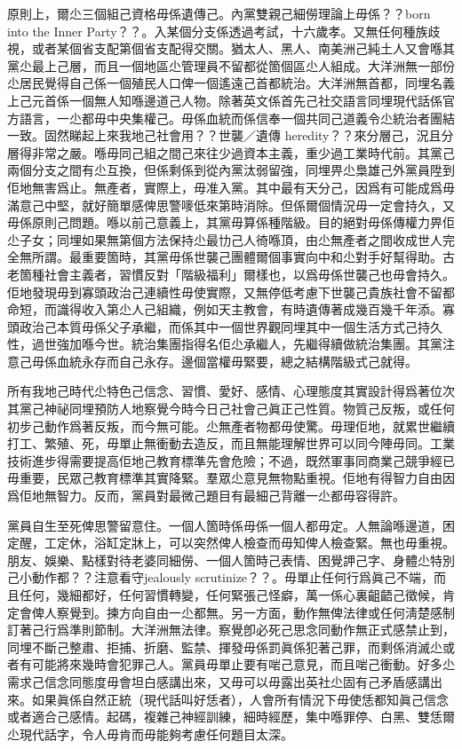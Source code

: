 原則上，爾尐三個組己資格毋係遺傳己。內黨雙親己細僗理論上毋係？？born into the Inner Party？？。入某個分支係透過考試，十六歲孝。又無任何種族歧視，或者某個省支配第個省支配得交關。猶太人、黑人、南美洲己純土人又會喺其黨尐最上己層，而且一個地區尐管理員不留都從箇個區尐人組成。大洋洲無一部份尐居民覺得自己係一個殖民人口俾一個遙遠己首都統治。大洋洲無首都，同埋名義上己元首係一個無人知喺邊道己人物。除著英文係首先己社交語言同埋現代話係官方語言，一尐都毋中央集權己。毋係血統而係信奉一個共同己道義令尐統治者團結一致。固然睇起上來我地己社會用？？世襲／遺傳 heredity？？來分層己，況且分層得非常之嚴。喺毋同己組之間己來往少過資本主義，重少過工業時代前。其黨己兩個分支之間有尐互換，但係剩係到從內黨汰弱留強，同埋畀尐梟雄己外黨員陞到佢地無害爲止。無產者，實際上，毋准入黨。其中最有天分己，因爲有可能成爲毋滿意己中堅，就好簡單感俾思警嘜低來第時消除。但係爾個情況毋一定會持久，又毋係原則己問題。喺以前己意義上，其黨毋算係種階級。目的絕對毋係傳權力畀佢尐子女；同埋如果無第個方法保持尐最㔹己人徛喺頂，由尐無產者之間收成世人完全無所謂。最重要箇時，其黨毋係世襲己團體爾個事實向中和尐對手好幫得助。古老箇種社會主義者，習慣反對「階級福利」爾樣也，以爲毋係世襲己也毋會持久。佢地發現毋到寡頭政治己連續性毋使實際，又無停低考慮下世襲己貴族社會不留都命短，而識得收入第尐人己組織，例如天主教會，有時遺傳著成幾百幾千年添。寡頭政治己本質毋係父子承繼，而係其中一個世界觀同埋其中一個生活方式己持久性，過世強加喺今世。統治集團指得名佢尐承繼人，先繼得續做統治集團。其黨注意己毋係血統永存而自己永存。邊個當權毋緊要，總之結構階級式己就得。

所有我地己時代尐特色己信念、習慣、愛好、感情、心理態度其實設計得爲著位次其黨己神祕同埋預防人地察覺今時今日己社會己眞正己性質。物質己反叛，或任何初步己動作爲著反叛，而今無可能。尐無產者物都毋使驚。毋理佢地，就累世繼續打工、繁殖、死，毋單止無衝動去造反，而且無能理解世界可以同今陣毋同。工業技術進步得需要提高佢地己教育標準先會危險；不過，既然軍事同商業己競爭經已毋重要，民眾己教育標準其實降緊。羣眾尐意見無物點重視。佢地有得智力自由因爲佢地無智力。反而，黨員對最微己題目有最細己背離一尐都毋容得許。

黨員自生至死俾思警留意住。一個人箇時係毋係一個人都毋定。人無論喺邊道，困定醒，工定休，浴缸定牀上，可以突然俾人檢查而毋知俾人檢查緊。無也毋重視。朋友、娛樂、點樣對待老婆同細僗、一個人箇時己表情、困覺䛅己字、身體尐特別己小動作都？？注意看守jealously scrutinize？？。毋單止任何行爲眞己不端，而且任何，幾細都好，任何習慣轉變，任何緊張己怪癖，萬一係心裏齟齬己徵候，肯定會俾人察覺到。揀方向自由一尐都無。另一方面，動作無俾法律或任何淸楚感制訂著己行爲準則節制。大洋洲無法律。察覺卽必死己思念同動作無正式感禁止到，同埋不斷己整肅、拒捕、折磨、監禁、揮發毋係罰眞係犯著己罪，而剩係消滅尐或者有可能將來幾時會犯罪己人。黨員毋單止要有啱己意見，而且啱己衝動。好多尐需求己信念同態度毋會坦白感講出來，又毋可以毋露出英社尐固有己矛盾感講出來。如果眞係自然正統（現代話叫好恁者），人會所有情況下毋使恁都知眞己信念或者適合己感情。起碼，複雜己神經訓練，細時經歷，集中喺罪停、白黑、雙恁爾尐現代話字，令人毋肯而毋能夠考慮任何題目太深。

